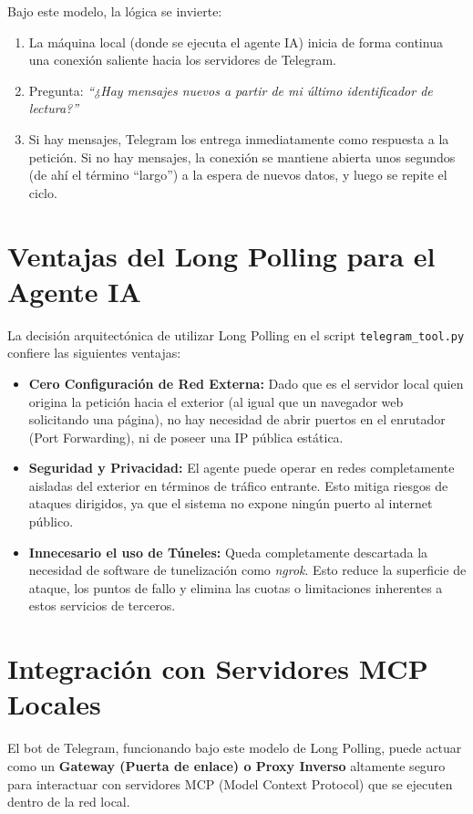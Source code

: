 \documentclass[12pt,a4paper]{article}
\begin{document}
Bajo este modelo, la lógica se invierte:
\begin{enumerate}
    \item La máquina local (donde se ejecuta el agente IA) inicia de forma continua una conexión saliente hacia los servidores de Telegram.
    \item Pregunta: \textit{``¿Hay mensajes nuevos a partir de mi último identificador de lectura?''}
    \item Si hay mensajes, Telegram los entrega inmediatamente como respuesta a la petición. Si no hay mensajes, la conexión se mantiene abierta unos segundos (de ahí el término ``largo'') a la espera de nuevos datos, y luego se repite el ciclo.
\end{enumerate}

\section{Ventajas del Long Polling para el Agente IA}
La decisión arquitectónica de utilizar Long Polling en el script \texttt{telegram\_tool.py} confiere las siguientes ventajas:

\begin{itemize}
    \item \textbf{Cero Configuración de Red Externa:} Dado que es el servidor local quien origina la petición hacia el exterior (al igual que un navegador web solicitando una página), no hay necesidad de abrir puertos en el enrutador (Port Forwarding), ni de poseer una IP pública estática.
    \item \textbf{Seguridad y Privacidad:} El agente puede operar en redes completamente aisladas del exterior en términos de tráfico entrante. Esto mitiga riesgos de ataques dirigidos, ya que el sistema no expone ningún puerto al internet público.
    \item \textbf{Innecesario el uso de Túneles:} Queda completamente descartada la necesidad de software de tunelización como \textit{ngrok}. Esto reduce la superficie de ataque, los puntos de fallo y elimina las cuotas o limitaciones inherentes a estos servicios de terceros.
\end{itemize}

\section{Integración con Servidores MCP Locales}
El bot de Telegram, funcionando bajo este modelo de Long Polling, puede actuar como un \textbf{Gateway (Puerta de enlace) o Proxy Inverso} altamente seguro para interactuar con servidores MCP (Model Context Protocol) que se ejecuten dentro de la red local.
\end{document}
